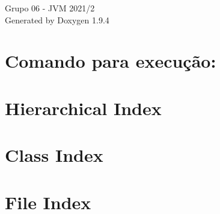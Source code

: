 \documentclass[twoside]{book}
\newcommand{\+}{\discretionary{\mbox{\scriptsize$\hookleftarrow$}}{}{}}
\newcommand{\clearemptydoublepage}{%
    \newpage{\pagestyle{empty}\cleardoublepage}%
  }
\begin{document}
  \raggedbottom
    \hypersetup{pageanchor=false,
                bookmarksnumbered=true,
                pdfencoding=unicode
               }
  \begin{titlepage}
  \vspace*{7cm}
  \begin{center}%
  {\Large Grupo 06 -\/  JVM 2021/2}\\
  \vspace*{1cm}
  {\large Generated by Doxygen 1.9.4}\\
  \end{center}
  \end{titlepage}
  \clearemptydoublepage
  \tableofcontents
  \clearemptydoublepage
  \hypersetup{pageanchor=true}
\chapter{Comando para execução\+:}
\label{md_README}

\chapter{Hierarchical Index}

\chapter{Class Index}

\chapter{File Index}

\end{document}
